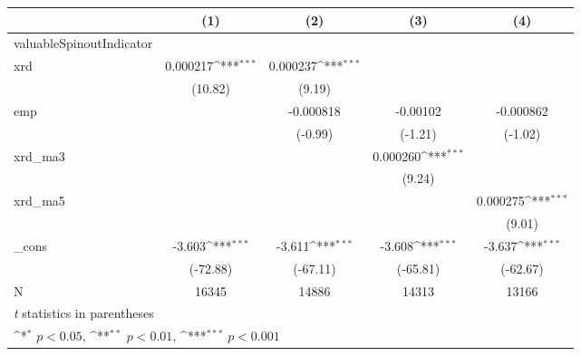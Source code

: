{
\def\sym#1{\ifmmode^{#1}\else\(^{#1}\)\fi}
\begin{tabular}{l*{4}{c}}
\hline\hline
            &\multicolumn{1}{c}{(1)}         &\multicolumn{1}{c}{(2)}         &\multicolumn{1}{c}{(3)}         &\multicolumn{1}{c}{(4)}         \\
\hline
valuableSpinoutIndicator&                     &                     &                     &                     \\
xrd         &    0.000217\sym{***}&    0.000237\sym{***}&                     &                     \\
            &     (10.82)         &      (9.19)         &                     &                     \\
[1em]
emp         &                     &   -0.000818         &    -0.00102         &   -0.000862         \\
            &                     &     (-0.99)         &     (-1.21)         &     (-1.02)         \\
[1em]
xrd\_ma3     &                     &                     &    0.000260\sym{***}&                     \\
            &                     &                     &      (9.24)         &                     \\
[1em]
xrd\_ma5     &                     &                     &                     &    0.000275\sym{***}\\
            &                     &                     &                     &      (9.01)         \\
[1em]
\_cons      &      -3.603\sym{***}&      -3.611\sym{***}&      -3.608\sym{***}&      -3.637\sym{***}\\
            &    (-72.88)         &    (-67.11)         &    (-65.81)         &    (-62.67)         \\
\hline
N           &       16345         &       14886         &       14313         &       13166         \\
\hline\hline
\multicolumn{5}{l}{\footnotesize \textit{t} statistics in parentheses}\\
\multicolumn{5}{l}{\footnotesize \sym{*} \(p<0.05\), \sym{**} \(p<0.01\), \sym{***} \(p<0.001\)}\\
\end{tabular}
}
